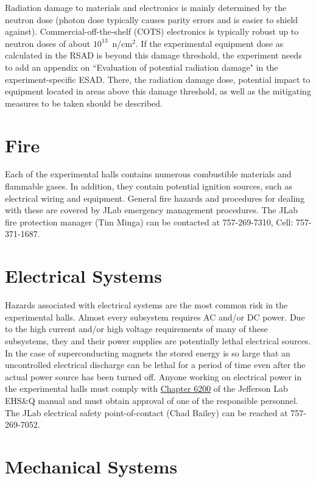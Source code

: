 \documentclass[12pt]{report}
\begin{document}
Radiation damage to materials and electronics is mainly determined by the neutron 
dose (photon dose typically causes parity errors and is easier to shield against). 
Commercial-off-the-shelf (COTS) electronics is typically robust up to neutron doses of 
about $10^{13}$~n/cm$^2$. If the experimental equipment dose as calculated in the RSAD 
is beyond this damage threshold, the experiment needs to add an appendix on ``Evaluation 
of potential radiation damage" in the experiment-specific ESAD. There, the radiation 
damage dose, potential impact to equipment located in areas above this damage threshold, 
as well as the mitigating measures to be taken should be described.

\section{Fire}

Each of the experimental halls contains numerous combustible materials and flammable gases. 
In addition, they contain potential ignition sources, such as electrical wiring and equipment. 
General fire hazards and procedures for dealing with these are covered by JLab emergency 
management procedures. The JLab fire protection manager (Tim Minga) can be contacted at 
757-269-7310, Cell: 757-371-1687.

\section{Electrical Systems}

Hazards associated with electrical systems are the most common risk in the experimental 
halls. Almost every subsystem requires AC and/or DC power. Due to the high current and/or 
high voltage requirements of many of these subsystems, they and their power supplies are 
potentially lethal electrical sources. In the case of superconducting magnets the stored 
energy is so large that an uncontrolled electrical discharge can be lethal for a period of 
time even after the actual power source has been turned off. Anyone working on electrical 
power in the experimental halls must comply with 
\href{http://www.jlab.org/ehs/ehsmanual/manual/6200.html}{Chapter 6200} of the Jefferson Lab 
EHS\&Q manual and must obtain approval of one of the responsible personnel. The JLab 
electrical safety point-of-contact (Chad Bailey) can be reached at 757-269-7052.

\section{Mechanical Systems}
\end{document}
